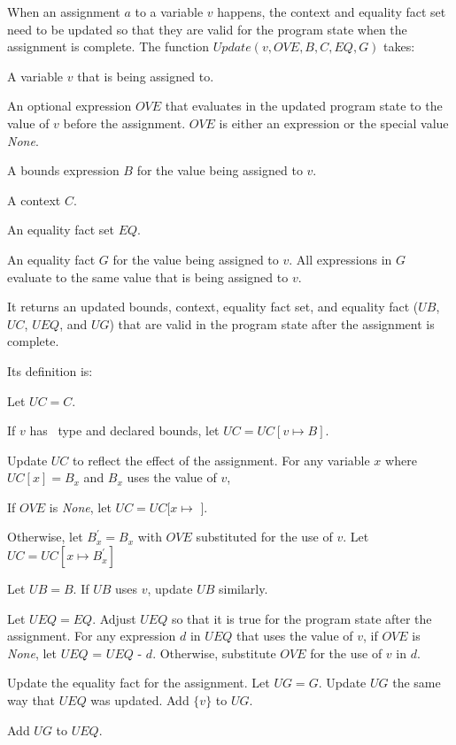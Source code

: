 When an assignment $a$ to a variable $v$ happens, the context and equality fact set 
need to be updated so that they are valid for the program state when the assignment is complete.
The function $Update(v, OVE, B, C, EQ, G)$ takes:
\begin{compactitem}
\item A variable $v$ that is being assigned to.
\item An optional expression $OVE$ that evaluates in the updated program state to the value of $v$ 
before the assignment.  $OVE$ is either an expression
or the special value {\it None}.
\item A bounds expression $B$ for the value being assigned to $v$.
\item A context $C$.
\item An equality fact set $EQ$. 
\item An equality fact $G$ for the value being assigned to $v$.  All expressions in $G$ 
evaluate to the same value that is being assigned to $v$.
\end{compactitem}
It returns an updated bounds, context, equality fact set, and equality fact ($UB$, $UC$, $UEQ$, and $UG$)
that are valid in the program state after the assignment is complete.

Its definition is:
\begin{compactenum}
\item Let $UC = C$.
\item If $v$ has \arrayptr\ type and declared bounds, let $UC = UC[v \mapsto B]$.
\item Update $UC$ to reflect the effect of the assignment.  For any variable $x$ where $UC[x] = B_x$ and
$B_x$ uses the value of $v$,
\begin{compactenum}
\item If $OVE$ is {\it None}, let $UC = UC[x \mapsto$ \boundsunknown $]$.
\item  Otherwise, let $B_x^\prime = B_x$ with $OVE$ substituted for the use of $v$.  
Let $UC = UC[x \mapsto B_x^\prime]$
\end{compactenum}
\item Let $UB = B$.  If $UB$ uses $v$, update $UB$ similarly.
\item Let $UEQ = EQ$.  Adjust $UEQ$ so that it is true for the program state after the assignment. For any expression $d$ in $UEQ$ that uses the value of $v$, if $OVE$ is {\it None}, let $UEQ$ = $UEQ $ - $d$.
Otherwise, substitute $OVE$ for the use of $v$ in $d$.
\item Update the equality fact for the assignment.   Let $UG = G$.  Update $UG$ the same way that $UEQ$ was updated.  Add $\{v\}$ to $UG$.
\item Add $UG$ to $UEQ$.
\end{compactenum}


